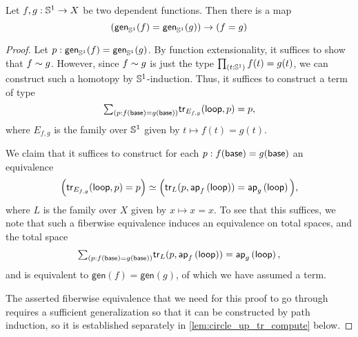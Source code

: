 \begin{lem}\label{lem:circle_up_htpy}
Let $f,g:\mathbb{S}^{1}\to X$ be two dependent functions. Then there is a map
\begin{equation*}
(\mathsf{gen}_{\mathbb{S}^{1}}(f)=\mathsf{gen}_{\mathbb{S}^{1}}(g))\to (f=g)
\end{equation*}
\end{lem}

\begin{proof}
Let $p:\mathsf{gen}_{\mathbb{S}^{1}}(f)=\mathsf{gen}_{\mathbb{S}^{1}}(g)$. By function extensionality, it suffices to show that $f\sim g$. However, since $f\sim g$ is just the type $\prd{t:\sphere{1}}f(t)=g(t)$, we can construct such a homotopy by $\mathbb{S}^{1}$-induction. Thus, it suffices to construct a term of type
\begin{equation*}
\sm{p:f(\base)=g(\base)} \mathsf{tr}_{E_{f,g}}(\lloop,p)=p, 
\end{equation*}
where $E_{f,g}$ is the family over $\mathbb{S}^{1}$ given by $t\mapsto f(t)=g(t)$.

We claim that it suffices to construct for each $p:f(\mathsf{base})=g(\mathsf{base})$ an equivalence
\begin{equation*}
\Big(\mathsf{tr}_{E_{f,g}}(\mathsf{loop},p)=p\Big)\simeq\Big(\mathsf{tr}_{L}(p,\mathsf{ap}_{f}\left({\mathsf{loop}}\right))=\mathsf{ap}_{g}\left({\mathsf{loop}}\right)\Big),
\end{equation*}
where $L$ is the family over $X$ given by $x\mapsto x=x$. 
To see that this suffices, we note that such a fiberwise equivalence induces an equivalence on total spaces, and the total space
\begin{align*}
\sm{p:f(\base)=g(\base)} \mathsf{tr}_{L}(p,\ap{f}{\lloop})=\ap{g}{\lloop},
\end{align*}
and is equivalent to $\mathsf{gen}(f)=\mathsf{gen}(g)$, of which we have assumed a term.

The asserted fiberwise equivalence that we need for this proof to go through requires a sufficient generalization so that it can be constructed by path induction, so it is established separately in \cref{lem:circle_up_tr_compute} below.
\end{proof}

\begin{comment}
Consider $f,g:\sphere{1}\to X$ with a homotopy $H:f\htpy g$. Then we have $H(\base):f(\base)=g(\base)$, and the square
\begin{equation*}
\begin{tikzcd}[column sep=large]
f(\base) \arrow[r,equals,"H(\base)"] \arrow[d,swap,equals,"\ap{f}{\lloop}"] & g(\base) \arrow[d,equals,"\ap{g}{\lloop}"] \\
f(\base) \arrow[r,equals,swap,"H(\base)"] & g(\base)
\end{tikzcd}
\end{equation*}
commutes by the naturality of homotopies, established in \cref{defn:htpy_nat}\index{naturality!of homotopies}. In the following lemma we will relate such squares in two ways to a transport, by generalizing the above situation sufficiently so that path induction becomes applicable. We will use these computations of transports to establish the universal property of the circle. 
\end{comment}

